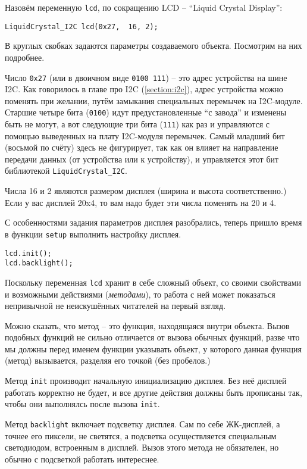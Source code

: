 \documentclass[../sparc.tex]{subfiles}
\begin{document}
Назовём переменную \texttt{lcd}, по сокращению \gls{LCD} -- ``Liquid Crystal
Display'':

\begin{verbatim}
LiquidCrystal_I2C lcd(0x27,  16, 2);
\end{verbatim}

В круглых скобках задаются параметры создаваемого объекта.  Посмотрим на них
подробнее.

Число \texttt{0x27} (или в двоичном виде \texttt{0100 111}) -- это адрес
устройства на шине I2C.  Как говорилось в главе про I2C (\ref{section:i2c}),
адрес устройства можно поменять при желании, путём замыкания специальных
перемычек на I2C-модуле.  Старшие четыре бита (\texttt{0100}) идут
предустановленные ``с завода'' и изменены быть не могут, а вот следующие три
бита (\texttt{111}) как раз и управляются с помощью выведенных на плату
I2C-модуля перемычек.  Самый младший бит (восьмой по счёту) здесь не фигурирует,
так как он влияет на направление передачи данных (от устройства или к
устройству), и управляется этот бит библиотекой \texttt{LiquidCrystal\_I2C}.

Числа 16 и 2 являются размером дисплея (ширина и высота соответственно.)  Если у
вас дисплей 20x4, то вам надо будет эти числа поменять на 20 и 4.

С особенностями задания параметров дисплея разобрались, теперь пришло время в
функции \texttt{setup} выполнить настройку дисплея.

\begin{verbatim}
lcd.init();
lcd.backlight();
\end{verbatim}

Поскольку переменная \texttt{lcd} хранит в себе сложный объект, со своими
свойствами и возможными действиями (\emph{методами}), то работа с ней может показаться
непривычной не неискушённых читателей на первый взгляд.

Можно сказать, что \gls{метод} -- это функция, находящаяся внутри объекта.
Вызов подобных функций не сильно отличается от вызова обычных функций, разве что
мы должны перед именем функции указывать объект, у которого данная функция
(метод) вызывается, разделяя его точкой (без пробелов.)

Метод \texttt{init} производит начальную инициализацию дисплея.  Без неё дисплей
работать корректно не будет, и все другие действия должны быть прописаны так,
чтобы они выполнялсь после вызова \texttt{init}.

Метод \texttt{backlight} включает подсветку дисплея.  Сам по себе ЖК-дисплей, а
точнее его пиксели, не светятся, а подсветка осуществляется специальным
светодиодом, встроенным в дисплей.  Вызов этого метода не обязателен, но обычно
с подсветкой работать интереснее.
\end{document}
